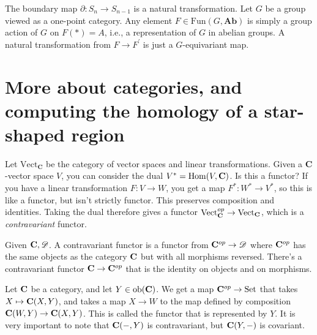 \begin{example}
The boundary map $\partial:S_n\to S_{n-1}$ is a natural transformation. Let $G$ be a group viewed as a one-point category. Any element $F\in\mathrm{Fun}(G,\mathbf{Ab})$ is simply a group action of $G$ on $F(\ast)=A$, i.e., a representation of $G$ in abelian groups. A natural transformation from $F\to F^\prime$ is just a $G$-equivariant map.
\end{example}
\section{More about categories, and computing the homology of a star-shaped region}
Let $\mathrm{Vect}_{\mathbf{C}}$ be the category of vector spaces and linear transformations. Given a $\mathbf{C}$-vector space $V$, you can consider the dual $V^\ast=\operatorname{Hom}(V,\mathbf C)$. Is this a functor? If you have a linear transformation $F:V\to W$, you get a map $F^\ast:W^\ast\to V^\ast$, so this is like a functor, but isn't strictly functor. This preserves composition and identities. Taking the dual therefore gives a functor $\mathrm{Vect}_\mathbf C^{op}\to\mathrm{Vect}_\mathbf C$, which is a \textit{contravariant} functor.
\begin{definition}
Given $\mathbf C,\mathscr D$. A contravariant functor is a functor from $\mathbf C^{op}\to\mathscr D$ where $\mathbf C^{op}$ has the same objects as the category $\mathbf C$ but with all morphisms reversed. There's a contravariant functor $\mathbf C\to\mathbf C^{op}$ that is the identity on objects and on morphisms.
\end{definition}
Let $\mathbf C$ be a category, and let $Y\in\mathrm{ob}(\mathbf C)$. We get a map $\mathbf C^{op}\to{\mathrm{Set}}$ that takes $X\mapsto \mathbf C(X,Y)$, and takes a map $X\to W$ to the map defined by composition $\mathbf C(W,Y)\to \mathbf C(X,Y)$. This is called the functor that is represented by $Y$. It is very important to note that $\mathbf C(-,Y)$ is contravariant, but $\mathbf C(Y,-)$ is covariant.

